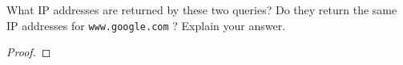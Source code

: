 \documentclass[../../main.tex]{subfiles}
\begin{document}
\begin{wts}
What IP addresses are returned by these two queries? Do they return the same IP addresses for \lstinline{www.google.com} ? Explain your answer.
\end{wts}
\begin{proof}

\end{proof}
\end{document}
